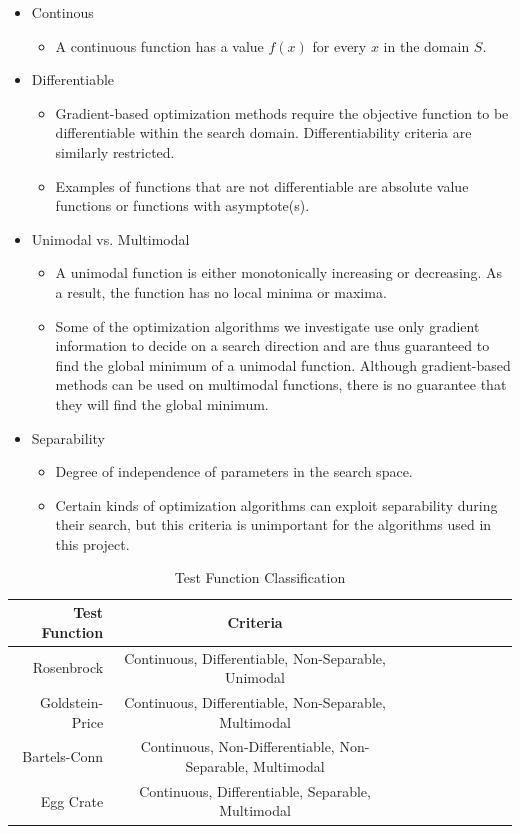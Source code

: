 \documentclass{vgtc}                          %
\begin{document}
\begin{itemize}
\item Continous
	\begin{itemize}
    	\item A continuous function has a value $f(x)$ for every $x$ in the domain $S$.
	\end{itemize}
\item Differentiable
	\begin{itemize}
    	\item Gradient-based optimization methods require the objective function to be differentiable within the search domain.  Differentiability criteria are similarly restricted.
    	\item Examples of functions that are not differentiable are absolute value functions or functions with asymptote(s).
	\end{itemize}
\item Unimodal vs. Multimodal
	\begin{itemize}
    	\item A unimodal function is either monotonically increasing or decreasing.  As a result, the function has no local minima or maxima.
    	\item Some of the optimization algorithms we investigate use only gradient information to decide on a search direction and are thus guaranteed to find the global minimum of a unimodal function.  Although gradient-based methods can be used on multimodal functions, there is no guarantee that they will find the global minimum.
	\end{itemize}
\item Separability
	\begin{itemize}
    	\item Degree of independence of parameters in the search space.
    	\item Certain kinds of optimization algorithms can exploit separability during their search, but this criteria is unimportant for the algorithms used in this project.
	\end{itemize}
\end{itemize}

\begin{table}[tb]
	\caption{Test Function Classification}
    \label{tab:test_function_class}
	\scriptsize
	\centering
	\begin{tabu}{
	  r
	  *{7}{c}
	  *{2}{r}
	}
  	\toprule
        Test Function & Criteria \\
	\midrule
        Rosenbrock & Continuous, Differentiable, Non-Separable, Unimodal \\
        Goldstein-Price & Continuous, Differentiable, Non-Separable, Multimodal \\
        Bartels-Conn & Continuous, Non-Differentiable, Non-Separable, Multimodal \\
        Egg Crate & Continuous, Differentiable, Separable, Multimodal \\
	\bottomrule
 	\end{tabu}
\end{table}
\end{document}
